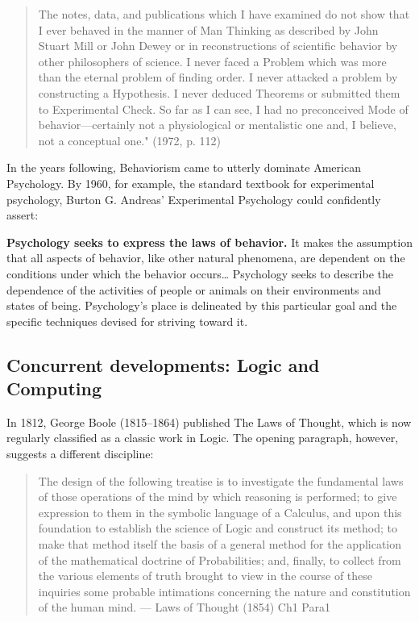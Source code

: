 \begin{refsection}
\begin{quote}
The notes, data, and publications which I have examined do not show that I ever behaved in the manner of Man Thinking as described by John Stuart Mill or John Dewey or in reconstructions of scientific behavior by other philosophers of science. I never faced a Problem which was more than the eternal problem of finding order. I never attacked a problem by constructing a Hypothesis. I never deduced Theorems or submitted them to Experimental Check. So far as I can see, I had no preconceived Mode of behavior---certainly not a physiological or mentalistic one and, I believe, not a conceptual one." (1972, p. 112)
\end{quote}

In the years following, Behaviorism came to utterly dominate American Psychology. By 1960, for example, the standard textbook for experimental psychology, Burton G. Andreas' Experimental Psychology could confidently assert:

\textbf{Psychology seeks to express the laws of behavior.} It makes the assumption that all aspects of behavior, like other natural phenomena, are dependent on the conditions under which the behavior occurs{\ldots} Psychology seeks to describe the dependence of the activities of people or animals on their environments and states of being. Psychology's place is delineated by this particular goal and the specific techniques devised for striving toward it. ~\citep[p. 4]{Andreas:WVE4neKa}

\subsection{Concurrent developments: Logic and Computing}
\label{concurrentdevelopments:logicandcomputing}

In 1812, George Boole (1815--1864) published The Laws of Thought, which is now regularly classified as a classic work in Logic. The opening paragraph, however, suggests a different discipline:

\begin{quote}

The design of the following treatise is to investigate the fundamental laws of those operations of the mind by which reasoning is performed; to give expression to them in the symbolic language of a Calculus, and upon this foundation to establish the science of Logic and construct its method; to make that method itself the basis of a general method for the application of the mathematical doctrine of Probabilities; and, finally, to collect from the various elements of truth brought to view in the course of these inquiries some probable intimations concerning the nature and constitution of the human mind. --- Laws of Thought (1854) Ch1 Para1
\end{quote}


\end{refsection}
